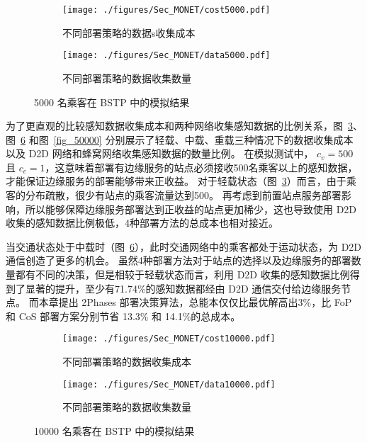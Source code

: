 \begin{figure}[!b]
  \centering
  \begin{subfigure}[b]{0.45\linewidth}
    \texttt{[image: ./figures/Sec\_MONET/cost5000.pdf]}
    \label{fig_cost5000}
    \vspace{-2em}
    \caption{不同部署策略的数据s收集成本}
  \end{subfigure}
  \begin{subfigure}[b]{0.45\linewidth}
    \texttt{[image: ./figures/Sec\_MONET/data5000.pdf]}
    \label{fig_data5000}
    \vspace{-2em}
    \caption{不同部署策略的数据收集数量}
  \end{subfigure}
    \vspace{-0.5em}
    \caption{5000 名乘客在 BSTP 中的模拟结果}
  \label{fig_5000}
\end{figure}

为了更直观的比较感知数据收集成本和两种网络收集感知数据的比例关系，图~\ref{fig_5000}、图~\ref{fig_10000} 和图~\ref{fig_50000} 分别展示了轻载、中载、重载三种情况下的数据收集成本以及 D2D 网络和蜂窝网络收集感知数据的数量比例。
在模拟测试中， $c_v = 500$ 且 $c_c = 1$，这意味着部署有边缘服务的站点必须接收500名乘客以上的感知数据，才能保证边缘服务的部署能够带来正收益。
对于轻载状态（图~\ref{fig_5000}）而言，由于乘客的分布疏散，很少有站点的乘客流量达到500。
再考虑到前置站点服务部署影响，所以能够保障边缘服务部署达到正收益的站点更加稀少，这也导致使用 D2D 收集的感知数据比例极低，4种部署方法的总成本也相对接近。


当交通状态处于中载时（图~\ref{fig_10000}），此时交通网络中的乘客都处于运动状态，为 D2D 通信创造了更多的机会。
虽然4种部署方法对于站点的选择以及边缘服务的部署数量都有不同的决策，但是相较于轻载状态而言，利用 D2D 收集的感知数据比例得到了显著的提升，至少有71.74\%的感知数据都经由 D2D 通信交付给边缘服务节点。
而本章提出 2\-Phases 部署决策算法，总能本仅仅比最优解高出3\%，比 FoP 和 CoS 部署方案分别节省 13.3\% 和 14.1\%的总成本。

\begin{figure}[!h]
  \centering
  \begin{subfigure}[b]{0.45\linewidth}
    \texttt{[image: ./figures/Sec\_MONET/cost10000.pdf]}
    \label{fig_cost10000}
    \vspace{-2em}
    \caption{不同部署策略的数据收集成本}
  \end{subfigure}
  \begin{subfigure}[b]{0.45\linewidth}
    \texttt{[image: ./figures/Sec\_MONET/data10000.pdf]}
    \label{fig_data10000}
    \vspace{-2em}
    \caption{不同部署策略的数据收集数量}
  \end{subfigure}
    \vspace{-0.5em}
    \caption{10000 名乘客在 BSTP 中的模拟结果}
  \label{fig_10000}
\end{figure}

